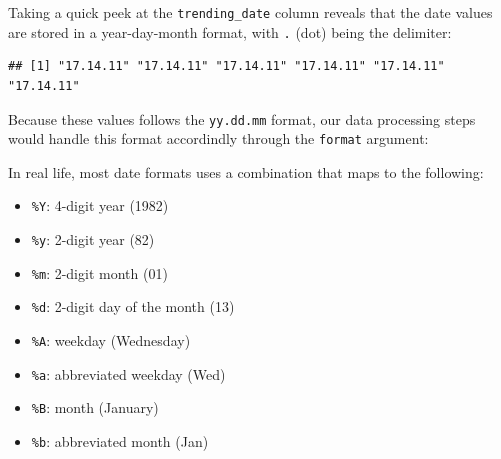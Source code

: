\documentclass[]{article}
\newenvironment{Shaded}{\begin{snugshade}}{\end{snugshade}}
\newcommand{\DataTypeTok}[1]{\textcolor[rgb]{0.13,0.29,0.53}{#1}}
\newcommand{\KeywordTok}[1]{\textcolor[rgb]{0.13,0.29,0.53}{\textbf{#1}}}
\newcommand{\NormalTok}[1]{#1}
\newcommand{\OperatorTok}[1]{\textcolor[rgb]{0.81,0.36,0.00}{\textbf{#1}}}
\newcommand{\StringTok}[1]{\textcolor[rgb]{0.31,0.60,0.02}{#1}}
\providecommand{\tightlist}{%
  \setlength{\itemsep}{0pt}\setlength{\parskip}{0pt}}
\begin{document}
Taking a quick peek at the \texttt{trending\_date} column reveals that
the date values are stored in a year-day-month format, with \texttt{.}
(dot) being the delimiter:

\begin{Shaded}
\end{Shaded}

\begin{verbatim}
## [1] "17.14.11" "17.14.11" "17.14.11" "17.14.11" "17.14.11" "17.14.11"
\end{verbatim}

Because these values follows the \texttt{yy.dd.mm} format, our data
processing steps would handle this format accordindly through the
\texttt{format} argument:

\begin{Shaded}
\end{Shaded}

In real life, most date formats uses a combination that maps to the
following:

\begin{itemize}
\tightlist
\item
  \texttt{\%Y}: 4-digit year (1982)\\
\item
  \texttt{\%y}: 2-digit year (82)\\
\item
  \texttt{\%m}: 2-digit month (01)\\
\item
  \texttt{\%d}: 2-digit day of the month (13)\\
\item
  \texttt{\%A}: weekday (Wednesday)\\
\item
  \texttt{\%a}: abbreviated weekday (Wed)\\
\item
  \texttt{\%B}: month (January)\\
\item
  \texttt{\%b}: abbreviated month (Jan)
\end{itemize}
\end{document}
